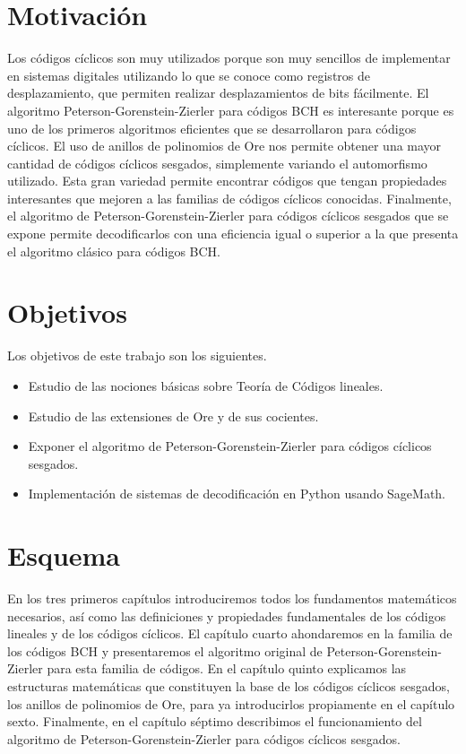 \section*{Motivación}

Los códigos cíclicos son muy utilizados porque son muy sencillos de implementar en sistemas digitales utilizando lo que se conoce como registros de desplazamiento, que permiten realizar desplazamientos de bits fácilmente.
El algoritmo Peterson-Gorenstein-Zierler para códigos BCH es interesante porque es uno de los primeros algoritmos eficientes que se desarrollaron para códigos cíclicos.
El uso de anillos de polinomios de Ore nos permite obtener una mayor cantidad de códigos cíclicos sesgados, simplemente variando el automorfismo utilizado.
Esta gran variedad permite encontrar códigos que tengan propiedades interesantes que mejoren a las familias de códigos cíclicos conocidas.
Finalmente, el algoritmo de Peterson-Gorenstein-Zierler para códigos cíclicos sesgados que se expone permite decodificarlos con una eficiencia igual o superior a la que presenta el algoritmo clásico para códigos BCH.

\section*{Objetivos}

Los objetivos de este trabajo son los siguientes. \begin{itemize}
  \item Estudio de las nociones básicas sobre Teoría de Códigos lineales.
  \item Estudio de las extensiones de Ore y de sus cocientes.
  \item Exponer el algoritmo de Peterson-Gorenstein-Zierler para códigos cíclicos sesgados.
  \item Implementación de sistemas de decodificación en Python usando SageMath.
\end{itemize}

\section*{Esquema}

En los tres primeros capítulos introduciremos todos los fundamentos matemáticos necesarios, así como las definiciones y propiedades fundamentales de los códigos lineales y de los códigos cíclicos.
El capítulo cuarto ahondaremos en la familia de los códigos BCH y presentaremos el algoritmo original de Peterson-Gorenstein-Zierler para esta familia de códigos.
En el capítulo quinto explicamos las estructuras matemáticas que constituyen la base de los códigos cíclicos sesgados, los anillos de polinomios de Ore, para ya introducirlos propiamente en el capítulo sexto.
Finalmente, en el capítulo séptimo describimos el funcionamiento del algoritmo de Peterson-Gorenstein-Zierler para códigos cíclicos sesgados.



